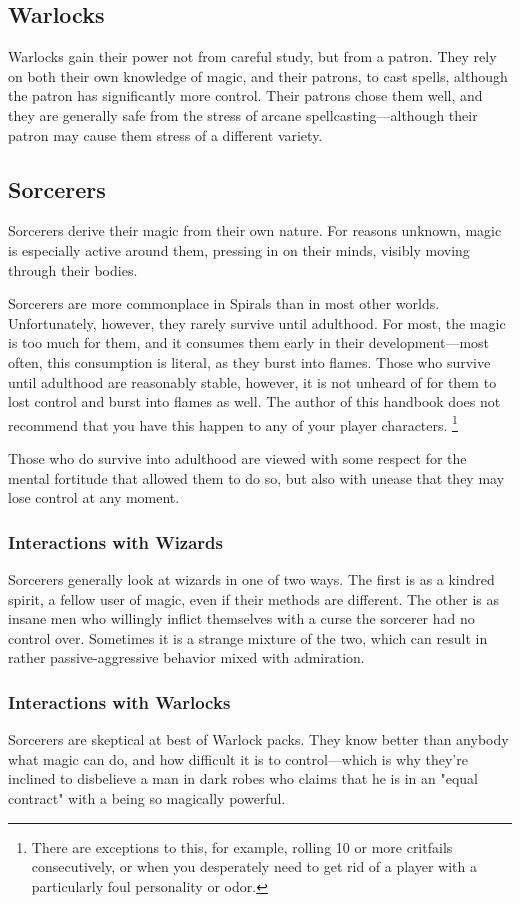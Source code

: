 \begin{multicols}{2}
\subsection{Warlocks}
Warlocks gain their power not from careful study, but from a patron.
They rely on both their own knowledge of magic, and their patrons, to cast spells, although the patron has significantly more control.
Their patrons chose them well, and they are generally safe from the stress of arcane spellcasting---although their patron may cause them stress of a different variety.

\subsection{Sorcerers}
Sorcerers derive their magic from their own nature.
For reasons unknown, magic is especially active around them, pressing in on their minds, visibly moving through their bodies.

Sorcerers are more commonplace in Spirals than in most other worlds.
Unfortunately, however, they rarely survive until adulthood.
For most, the magic is too much for them, and it consumes them early in their development---most often, this consumption is literal, as they burst into flames.
Those who survive until adulthood are reasonably stable, however, it is not unheard of for them to lost control and burst into flames as well.
The author of this handbook does not recommend that you have this happen to any of your player characters.
\footnote{There are exceptions to this, for example, rolling 10 or more critfails consecutively, or when you desperately need to get rid of a player with a particularly foul personality or odor.}

Those who do survive into adulthood are viewed with some respect for the mental fortitude that allowed them to do so, but also with unease that they may lose control at any moment.

\subsubsection{Interactions with Wizards}
Sorcerers generally look at wizards in one of two ways.
The first is as a kindred spirit, a fellow user of magic, even if their methods are different.
The other is as insane men who willingly inflict themselves with a curse the sorcerer had no control over.
Sometimes it is a strange mixture of the two, which can result in rather passive-aggressive behavior mixed with admiration.

\subsubsection{Interactions with Warlocks}
Sorcerers are skeptical at best of Warlock packs.
They know better than anybody what magic can do, and how difficult it is to control---which is why they're inclined to disbelieve a man in dark robes who claims that he is in an "equal contract" with a being so magically powerful.


\end{multicols}